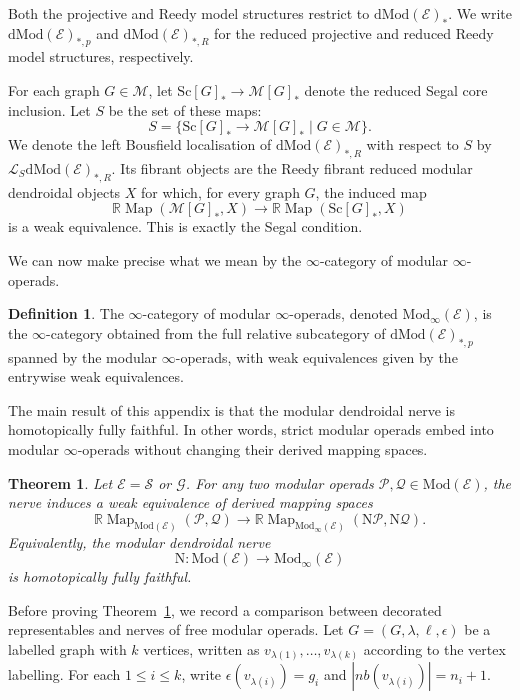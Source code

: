 \documentclass{amsart}
\newcommand{\bE}{\mathscr{E}}
\newcommand{\bM}{\mathscr{M}}
\newcommand{\calQ}{\mathcal{Q}}
\newcommand{\sSet}{\mathscr{S}}
\newcommand{\Grpd}{\mathscr{G}}
\newcommand{\calP}{\mathcal{P}}
\newcommand{\Mod}{\mathrm{Mod}}
\newcommand{\dMod}{\mathrm{dMod}}
\newcommand{\Sc}{\mathrm{Sc}}
\newcommand{\nerve}{\mathrm{N}}
\newcommand{\Map}{\operatorname{Map}}
\newcommand{\nb}{nb}
\newtheorem{thm}[theorem]{Theorem}%
\theoremstyle{definition}
\newtheorem{definition}[theorem]{Definition}%
\numberwithin{equation}{section}
\begin{document}
Both the projective and Reedy model structures restrict to $\dMod(\bE)_*$. We write $\dMod(\bE)_{*,p}$ and $\dMod(\bE)_{*,R}$ for the reduced projective and reduced Reedy model structures, respectively.

For each graph $G\in\bM$, let $\Sc[G]_*\longrightarrow \bM[G]_*$ denote the reduced Segal core inclusion. Let $S$ be the set of these maps:
\[
S=\{\Sc[G]_*\longrightarrow \bM[G]_*\mid G\in\bM\}.
\] We denote the left Bousfield localisation of $\dMod(\bE)_{*,R}$ with respect to $S$ by $\mathcal{L}_S\dMod(\bE)_{*,R}$. Its fibrant objects are the Reedy
fibrant reduced modular dendroidal objects $X$ for which, for every graph $G$, the induced map
\[
\mathbb R\Map(\bM[G]_*,X)\longrightarrow \mathbb R\Map(\Sc[G]_*,X)
\]
is a weak equivalence. This is exactly the Segal condition.

We can now make precise what we mean by the $\infty$-category of modular $\infty$-operads.


\begin{definition}\label{def: infinity cat of infinity modular operads}
The $\infty$-category of modular $\infty$-operads, denoted $\Mod_{\infty}(\bE)$, is the $\infty$-category obtained from the full relative subcategory of $\dMod(\bE)_{*,p}$ spanned by the modular $\infty$-operads, with weak equivalences given by the entrywise weak equivalences.
\end{definition}

The main result of this appendix is that the modular dendroidal nerve is homotopically fully faithful. In other words, strict modular operads embed into modular $\infty$-operads without changing their derived mapping spaces.

\begin{thm}\label{thm: nerve is homotopically fully faithful}
Let $\bE=\sSet$ or $\Grpd$. For any two modular operads $\calP,\calQ\in\Mod(\bE)$, the nerve induces a weak equivalence of derived mapping spaces
\[
\mathbb{R}\Map_{\Mod(\bE)}(\calP,\calQ)
\longrightarrow
\mathbb{R}\Map_{\Mod_{\infty}(\bE)}(\nerve\calP,\nerve\calQ).
\]
Equivalently, the modular dendroidal nerve
\[
\nerve:\Mod(\bE)\longrightarrow \Mod_{\infty}(\bE)
\]
is homotopically fully faithful.
\end{thm}

Before proving Theorem~\ref{thm: nerve is homotopically fully faithful}, we record a comparison between decorated representables and nerves of free modular
operads. Let $G=(G,\lambda,\ell,\epsilon)$ be a labelled graph with $k$ vertices, written as $v_{\lambda(1)},\ldots,v_{\lambda(k)}$ according to the vertex labelling. For each $1\leq i\leq k$, write $\epsilon(v_{\lambda(i)})=g_i$ and $|\nb(v_{\lambda(i)})|=n_i+1$.
\end{document}
